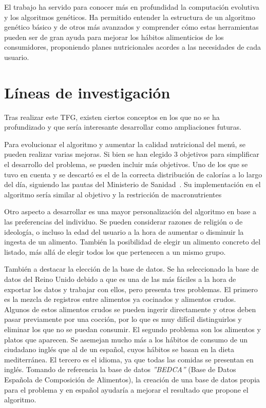 El trabajo ha servido para conocer más en profundidad la computación evolutiva y los algoritmos genéticos. Ha permitido entender la estructura de un algoritmo genético básico y de otros más avanzados y comprender cómo estas herramientas pueden ser de gran ayuda para mejorar los hábitos alimenticios de los consumidores, proponiendo planes nutricionales acordes a las necesidades de cada usuario.

\section{Líneas de investigación}
\label{ch:investigacion}

Tras realizar este TFG, existen ciertos conceptos en los que no se ha profundizado y que sería interesante desarrollar como ampliaciones futuras.

Para evolucionar el algoritmo y aumentar la calidad nutricional del menú, se pueden realizar varias mejoras. Si bien se han elegido 3 objetivos para simplificar el desarrollo del problema, se pueden incluir más objetivos. Uno de los que se tuvo en cuenta y se descartó es el de la correcta distribución de calorías a lo largo del día, siguiendo las pautas del Ministerio de Sanidad~\cite{alimentacion_saludable}. Su implementación en el algoritmo sería similar al objetivo y la restricción de macronutrientes

Otro aspecto a desarrollar es una mayor personalización del algoritmo en base a las preferencias del individuo. Se pueden considerar razones de religión o de ideología, o incluso la edad del usuario a la hora de aumentar o disminuir la ingesta de un alimento. También la posibilidad de elegir un alimento concreto del listado, más allá de elegir todos los que pertenecen a un mismo grupo.

También a destacar la elección de la base de datos. Se ha seleccionado la base de datos del Reino Unido debido a que es una de las más fáciles a la hora de exportar los datos y trabajar con ellos, pero presenta tres problemas. El primero es la mezcla de registros entre alimentos ya cocinados y alimentos crudos. Algunos de estos alimentos crudos se pueden ingerir directamente y otros deben pasar previamente por una cocción, por lo que es muy difícil distinguirlos y eliminar los que no se puedan consumir. El segundo problema son los alimentos y platos que aparecen. Se asemejan mucho más a los hábitos de consumo de un ciudadano inglés que al de un español, cuyos hábitos se basan en la dieta mediterránea. El tercero es el idioma, ya que todas las comidas se presentan en inglés. Tomando de referencia la base de datos \textit{''BEDCA''} (Base de Datos Española de Composición de Alimentos), la creación de una base de datos propia para el problema y en español ayudaría a mejorar el resultado que propone el algoritmo.

